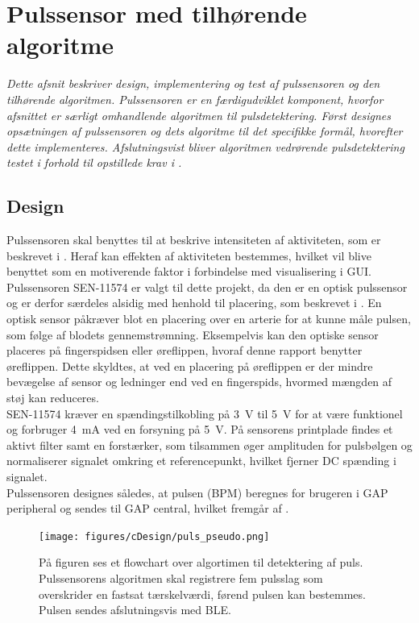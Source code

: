 \section{Pulssensor med tilhørende algoritme}\label{sec_de_im_te_puls}
\textit{Dette afsnit beskriver design, implementering og test af pulssensoren og den tilhørende algoritmen. Pulssensoren er en færdigudviklet komponent, hvorfor afsnittet er særligt omhandlende algoritmen til pulsdetektering. Først designes opsætningen af pulssensoren og dets algoritme til det specifikke formål, hvorefter dette implementeres. Afslutningsvist bliver algoritmen vedrørende pulsdetektering testet i forhold til opstillede krav i .}

\subsection{Design} \label{sec_design_puls}
Pulssensoren skal benyttes til at beskrive intensiteten af aktiviteten, som er beskrevet i . Heraf kan effekten af aktiviteten bestemmes, hvilket vil blive benyttet som en motiverende faktor i forbindelse med visualisering i GUI. \newline
Pulssensoren SEN-11574 er valgt til dette projekt, da den er en optisk pulssensor og er derfor særdeles alsidig med henhold til placering, som beskrevet i . En optisk sensor påkræver blot en placering over en arterie for at kunne måle pulsen, som følge af blodets gennemstrømning. Eksempelvis kan den optiske sensor placeres på fingerspidsen eller øreflippen, hvoraf denne rapport benytter øreflippen. Dette skyldtes, at ved en placering på øreflippen er der mindre bevægelse af sensor og ledninger end ved en fingerspids, hvormed mængden af støj kan reduceres. \\
SEN-11574 kræver en spændingstilkobling på 3~V til 5~V for at være funktionel og forbruger 4~mA ved en forsyning på 5~V. På sensorens printplade findes et aktivt filter samt en forstærker, som tilsammen øger amplituden for pulsbølgen og normaliserer signalet omkring et referencepunkt, hvilket fjerner DC spænding i signalet. \citep{Murphy2016,Murphy2016_sensor}\\
Pulssensoren designes således, at pulsen (BPM) beregnes for brugeren i GAP peripheral og sendes til GAP central, hvilket fremgår af .
\begin{figure}[H]
	\centering
	\texttt{[image: figures/cDesign/puls\_pseudo.png]}
	\caption{På figuren ses et flowchart over algortimen til detektering af puls. Pulssensorens algoritmen skal registrere fem pulsslag som overskrider en fastsat tærskelværdi, førend pulsen kan bestemmes. Pulsen sendes afslutningsvis med BLE.}
	\label{fig:puls_pseudo}
\end{figure}
